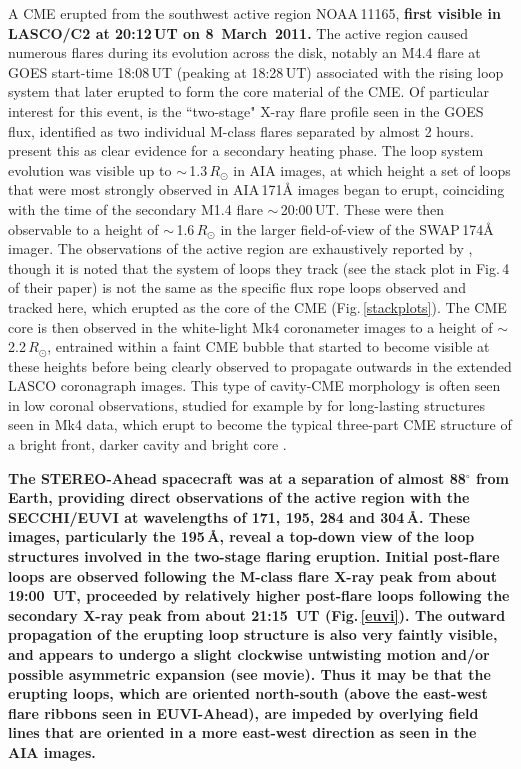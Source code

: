 \documentclass[namedreferences]{solarphysics}
\begin{document}
\begin{article}
A CME erupted from the southwest active region NOAA\,11165, {\bf first visible in LASCO/C2 at 20:12\,UT on 8~March~2011.} The active region caused numerous flares during its evolution across the disk, notably an M4.4 flare at GOES start-time 18:08\,UT (peaking at 18:28\,UT) associated with the rising loop system that later erupted to form the core material of the CME. Of particular interest for this event, is the ``two-stage" X-ray flare profile seen in the GOES flux, identified as two individual M-class flares separated by almost 2 hours.  present this as clear evidence for a secondary heating phase. The loop system evolution was visible up to $\sim$\,1.3\,$R_{\odot}$ in AIA images, at which height a set of loops that were most strongly observed in AIA\,171{\AA} images began to erupt, coinciding with the time of the secondary M1.4 flare $\sim$\,20:00\,UT. These were then observable to a height of $\sim$\,1.6\,$R_{\odot}$ in the larger field-of-view of the SWAP\,174{\AA} imager. The observations of the active region are exhaustively reported by , though it is noted that the system of loops they track (see the stack plot in Fig.\,4 of their paper) is not the same as the specific flux rope loops observed and tracked here, which erupted as the core of the CME (Fig.\,\ref{stackplots}). The CME core is then observed in the white-light Mk4 coronameter images to a height of $\sim$\,2.2\,$R_{\odot}$, entrained within a faint CME bubble that started to become visible at these heights before being clearly observed to propagate outwards in the extended LASCO coronagraph images. This type of cavity-CME morphology is often seen in low coronal observations, studied for example by  for long-lasting structures seen in Mk4 data, which erupt to become the typical three-part CME structure of a bright front, darker cavity and bright core \cite{1986JGR....9110951I}.  %

{\bf The STEREO-Ahead spacecraft was at a separation of almost 88$^{\circ}$ from Earth, providing direct observations of the active region with the SECCHI/EUVI at wavelengths of 171, 195, 284 and 304\,\AA. These images, particularly the 195\,\AA, reveal a top-down view of the loop structures involved in the two-stage flaring eruption. Initial post-flare loops are observed following the M-class flare X-ray peak from about 19:00~UT, proceeded by relatively higher post-flare loops following the secondary X-ray peak from about 21:15~UT (Fig.\,\ref{euvi}). The outward propagation of the erupting loop structure is also very faintly visible, and appears to undergo a slight clockwise untwisting motion and/or possible asymmetric expansion (see movie). Thus it may be that the erupting loops, which are oriented north-south (above the east-west flare ribbons seen in EUVI-Ahead), are impeded by overlying field lines that are oriented in a more east-west direction as seen in the AIA images.}


\end{article}
\end{document}
